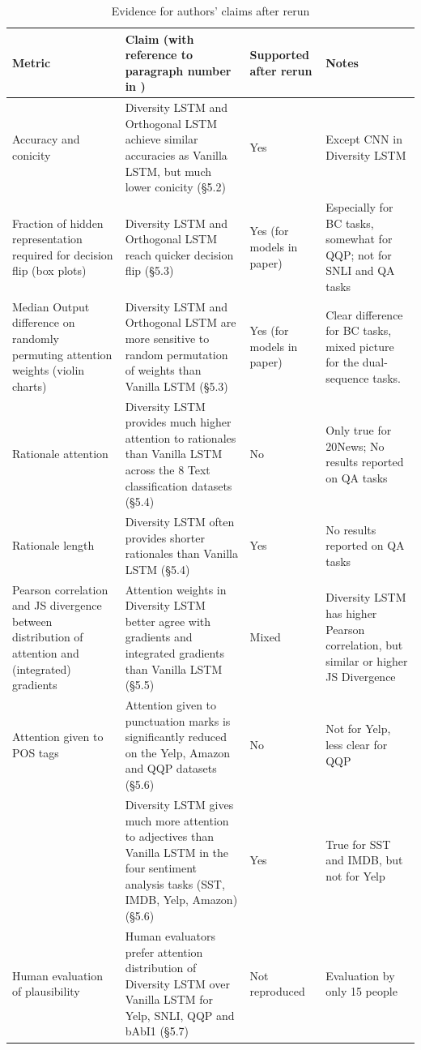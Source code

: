 \begin{table}[ht]
    \scriptsize
    \centering
    \begin{tabular}{|p{2.5cm}|p{5.5cm}|p{1.5cm}|p{2.5cm}|}
    \hline
    Metric & Claim (with reference to paragraph number in \citet{mohankumar_towards_2020})  & Supported after rerun & Notes \\
    \hline
    \hline
    Accuracy and conicity &  Diversity LSTM and Orthogonal LSTM achieve similar accuracies as Vanilla LSTM, but much lower conicity (\S 5.2) & Yes & Except CNN in Diversity LSTM \\
    \hline
    Fraction of hidden representation required for decision flip (box plots) & Diversity LSTM and Orthogonal LSTM reach quicker decision flip (\S 5.3) & Yes (for models in paper) & Especially for BC tasks, somewhat for QQP; not for SNLI and QA tasks \\
    \hline
    Median Output difference on randomly permuting attention weights (violin charts) & Diversity LSTM and Orthogonal LSTM are more sensitive to random permutation of weights than Vanilla LSTM (\S 5.3) & Yes (for models in paper) & Clear difference for BC tasks, mixed picture for the dual-sequence tasks. \\
    \hline
    Rationale attention & Diversity LSTM provides much higher attention to rationales than Vanilla LSTM across the 8 Text classification datasets (\S 5.4) & No & Only true for 20News; No results reported on QA tasks \\ 
    \hline
    Rationale length &  Diversity LSTM often provides shorter rationales than Vanilla LSTM (\S 5.4) & Yes & No results reported on QA tasks\\
    \hline
    Pearson correlation and JS divergence between distribution of attention and (integrated) gradients & Attention weights in Diversity LSTM better agree with gradients and integrated gradients than Vanilla LSTM (\S 5.5) & Mixed & Diversity LSTM has higher Pearson correlation, but similar or higher JS Divergence \\
    \hline
    Attention given to POS tags & Attention given to punctuation marks is significantly reduced on the Yelp, Amazon and QQP datasets (\S 5.6) & No & Not for Yelp, less clear for QQP \\
    \hline
     & Diversity LSTM gives much more attention to adjectives than Vanilla LSTM in the four sentiment analysis tasks (SST, IMDB, Yelp, Amazon) (\S 5.6) & Yes & True for SST and IMDB, but not for Yelp \\
    \hline
    Human evaluation of plausibility & Human evaluators prefer attention distribution of Diversity LSTM over Vanilla LSTM for Yelp, SNLI, QQP and bAbI1 (\S 5.7) & Not reproduced & Evaluation by only 15 people \\
    \hline
    \end{tabular}
    \caption{Evidence for authors' claims after rerun}
    \label{tab:claims}
\end{table}

